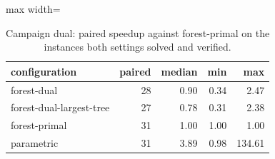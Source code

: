 \begin{table}[tbp]
\centering
\caption{Campaign dual: paired speedup against forest-primal on the instances both settings solved and verified.}
\label{tab:dual-speedup}
\small
\begin{adjustbox}{max width=\textwidth}
\begin{tabular}{lrrrr}
\toprule
configuration & paired & median & min & max \\
\midrule
forest-dual & 28 & 0.90 & 0.34 & 2.47 \\
forest-dual-largest-tree & 27 & 0.78 & 0.31 & 2.38 \\
forest-primal & 31 & 1.00 & 1.00 & 1.00 \\
parametric & 31 & 3.89 & 0.98 & 134.61 \\
\bottomrule
\end{tabular}
\end{adjustbox}
\end{table}
